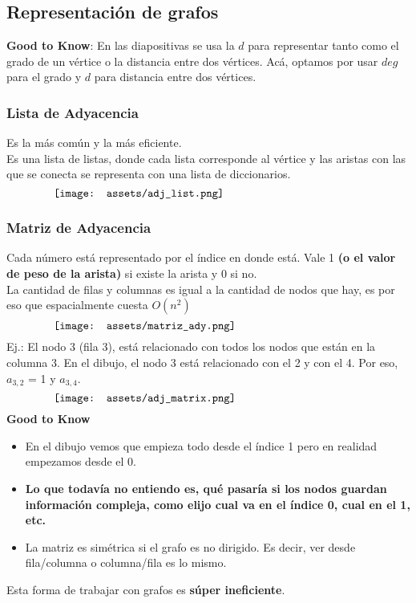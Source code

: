 \documentclass[10pt,a4paper]{article}
\begin{document}
\subsection*{Representación de grafos}
\textbf{Good to Know}: En las diapositivas se usa la $d$ para representar tanto como el grado de un vértice o la distancia entre dos vértices. Acá, optamos por usar $deg$ para el grado y $d$ para distancia entre dos vértices.
\subsubsection*{Lista de Adyacencia}
Es la más común y la más eficiente. \\
Es una lista de listas, donde cada lista corresponde al vértice y las aristas con las que se conecta se representa con una lista de diccionarios. 
\[\begin{minipage}[b]{0.8\textwidth}
    \texttt{[image: assets/adj\_list.png]}
\end{minipage}\]
\subsubsection*{Matriz de Adyacencia}
Cada número está representado por el índice en donde está. Vale 1 \textbf{(o el valor de peso de la arista)} si existe la arista y 0 si no. \\
La cantidad de filas y columnas es igual a la cantidad de nodos que hay, es por eso que espacialmente cuesta $O(n^{2})$
\[\begin{minipage}[b]{0.8\textwidth}
    \texttt{[image: assets/matriz\_ady.png]}
\end{minipage}\]
Ej.: El nodo 3 (fila 3), está relacionado con todos los nodos que están en la columna 3. En el dibujo, el nodo 3 está relacionado con el 2 y con el 4. Por eso, $a_{3, 2}$ = 1 y $a_{3, 4}$. 
\[\begin{minipage}[b]{0.8\textwidth}
    \texttt{[image: assets/adj\_matrix.png]}
\end{minipage}\]
\textbf{Good to Know}
\begin{itemize}
    \item En el dibujo vemos que empieza todo desde el índice 1 pero en realidad empezamos desde el 0. 
    \item \textbf{Lo que todavía no entiendo es, qué pasaría si los nodos guardan información compleja, como elijo cual va en el índice 0, cual en el 1, etc.} 
    \item La matriz es simétrica si el grafo es no dirigido. Es decir, ver desde fila/columna o columna/fila es lo mismo. 
\end{itemize}
Esta forma de trabajar con grafos es \textbf{súper ineficiente}. 
\end{document}
